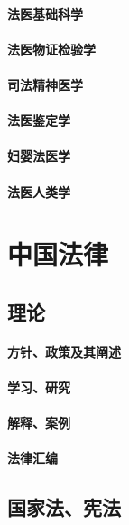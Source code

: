 \documentclass[UTF8]{../ApplicationUniverse}
\begin{document}
        \subsubsection{法医基础科学}
        \subsubsection{法医物证检验学}
        \subsubsection{司法精神医学}
        \subsubsection{法医鉴定学}
        \subsubsection{妇婴法医学}
        \subsubsection{法医人类学}
        







\chapter{中国法律}
\section{理论}
        \subsubsection{方针、政策及其阐述}
        \subsubsection{学习、研究}
        \subsubsection{解释、案例}
        \subsubsection{法律汇编}

\section{国家法、宪法}
\end{document}
